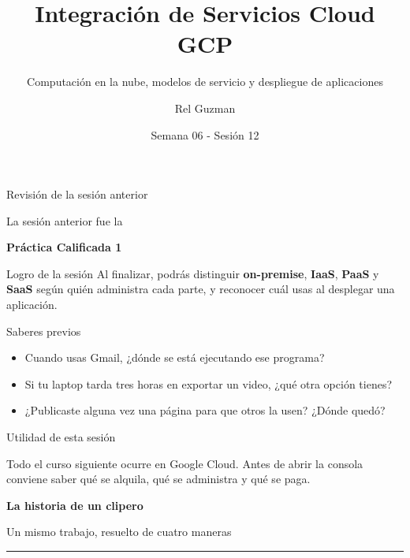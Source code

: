 \documentclass[aspectratio=169,10pt,c]{beamer}
\title{Integración de Servicios Cloud GCP}
\subtitle{Computación en la nube, modelos de servicio y despliegue de aplicaciones}
\date{Semana 06 - Sesión 12}
\author{Rel Guzman}
\begin{document}
{\maketitle}

\begin{frame}[c]{Revisión de la sesión anterior}
\begin{center}
{\fontsize{20}{25}\selectfont La sesión anterior fue la}\par\vspace{4mm}
{\fontsize{27}{32}\selectfont\bfseries Práctica Calificada 1}
\end{center}
\end{frame}

\begin{frame}[c]
\begin{block}{Logro de la sesión}
Al finalizar, podrás distinguir \textbf{on-premise}, \textbf{IaaS}, \textbf{PaaS} y \textbf{SaaS} según quién administra cada parte, y reconocer cuál usas al desplegar una aplicación.
\end{block}
\end{frame}

\begin{frame}{Saberes previos}
\begin{itemize}\setlength\itemsep{10pt}
  \item Cuando usas Gmail, ¿dónde se está ejecutando ese programa?
  \item Si tu laptop tarda tres horas en exportar un video, ¿qué otra opción tienes?
  \item ¿Publicaste alguna vez una página para que otros la usen? ¿Dónde quedó?
\end{itemize}
\end{frame}

\begin{frame}[c]{Utilidad de esta sesión}
\begin{center}
\begin{minipage}{.86\textwidth}
{\large Todo el curso siguiente ocurre en Google Cloud. Antes de abrir la consola conviene saber qué se alquila, qué se administra y qué se paga.}
\end{minipage}
\end{center}
\end{frame}

\begin{frame}[plain]
\vfill
\begin{center}
{\fontsize{29}{34}\selectfont\bfseries La historia de un clipero}\par
\vspace{2mm}
{\small Un mismo trabajo, resuelto de cuatro maneras}\par
\vspace{4mm}
{\color{utpRojo}\rule{8.5cm}{1.2pt}}
\end{center}
\vfill
\end{frame}
\end{document}
